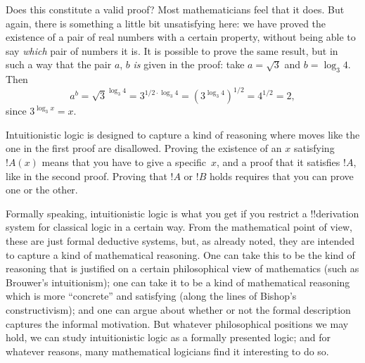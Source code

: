 \documentclass[../../../include/open-logic-chapter]{subfiles}
\begin{document}
Does this constitute a valid proof? Most mathematicians feel that it
does. But again, there is something a little bit unsatisfying here: we
have proved the existence of a pair of real numbers with a certain
property, without being able to say \emph{which} pair of numbers it
is.  It is possible to prove the same result, but in such a way that
the pair $a$, $b$ \emph{is} given in the proof: take $a = \sqrt{3}$
and $b = \log_3 4$. Then
\[
a^b = \sqrt{3}^{\log_3 4} = 3^{1/2 \cdot \log_3 4} = (3^{\log_3
  4})^{1/2} = 4^{1/2}= 2,
\]
since $3^{\log_3 x} = x$.

Intuitionistic logic is designed to capture a kind of reasoning where
moves like the one in the first proof are disallowed. Proving the
existence of an $x$ satisfying~$!A(x)$ means that you have to give a
specific~$x$, and a proof that it satisfies $!A$, like in the second
proof. Proving that $!A$ or $!B$ holds requires that you can prove one
or the other.

Formally speaking, intuitionistic logic is what you get if
you restrict a !!{derivation} system for classical logic in a certain
way. From the mathematical point of view, these are
just formal deductive systems, but, as already noted, they are
intended to capture a kind of mathematical reasoning. One can take this
to be the kind of reasoning that is justified on a certain
philosophical view of mathematics (such as Brouwer's intuitionism);
one can take it to be a kind of mathematical reasoning which is more
``concrete'' and satisfying (along the lines of Bishop's
constructivism); and one can argue about whether or not the formal
description captures the informal motivation. But whatever
philosophical positions we may hold, we can study intuitionistic logic
as a formally presented logic; and for whatever reasons, many
mathematical logicians find it interesting to do so.
\end{document}
